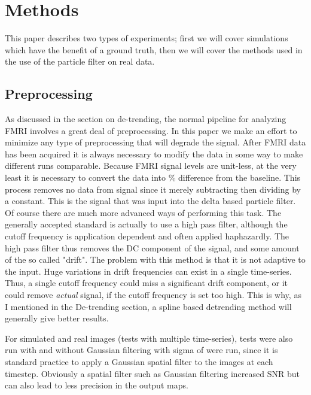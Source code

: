 \documentclass{article}
\begin{document}
\section{Methods}
This paper describes two types of experiments; first we will cover
simulations which have the benefit of a ground truth, then we will
cover the methods used in the use of the particle filter on real data.

\subsection{Preprocessing}
As discussed in the section on de-trending, the normal pipeline for analyzing
FMRI involves a great deal of preprocessing. In this paper we make an effort to
minimize any type of preprocessing that will degrade the signal. 
After FMRI data has been acquired it is always necessary to modify the
data in some way to make different runs comparable. Because FMRI signal
levels are unit-less, at the very least it is necessary to convert
the data into \% difference from the baseline. This process removes no data
from signal since it merely subtracting then dividing by a constant. This
is the signal that was input into the delta based particle filter.
Of course there are much more advanced ways of performing this task.
The generally accepted standard is actually to use a high pass filter, although the
cutoff frequency is application dependent and often applied haphazardly.
The high pass filter thus removes the DC component of the signal, and 
some amount of the so called "drift". The problem with this method is that it is
not adaptive to the input. Huge variations in drift frequencies can exist 
in a single time-series. Thus, a single cutoff frequency could miss a significant
drift component, or it could remove \emph{actual} signal, if the cutoff frequency is
set too high. This is why, as I mentioned in the De-trending section, a spline
based detrending method will generally give better results. 

For simulated and real images (tests with multiple time-series), tests were 
also run with and without Gaussian filtering with sigma of %
were run, since it is standard
practice to apply a Gaussian spatial filter to the images at each timestep. Obviously
a spatial filter such as Gaussian filtering increased SNR but can also lead to less
precision in the output maps.
\end{document}
